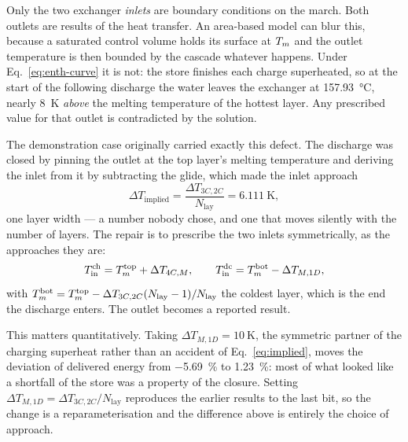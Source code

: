Only the two exchanger \emph{inlets} are boundary conditions on the march. Both
outlets are results of the heat transfer. An area-based model can blur this,
because a saturated control volume holds its surface at $T_{m}$ and the outlet
temperature is then bounded by the cascade whatever happens. Under
Eq.~\eqref{eq:enth-curve} it is not: the store finishes each charge superheated,
so at the start of the following discharge the water leaves the exchanger at
\SI{157.93}{\celsius}, nearly \SI{8}{\kelvin} \emph{above} the melting
temperature of the hottest layer. Any prescribed value for that outlet is
contradicted by the solution.

The demonstration case originally carried exactly this defect. The discharge was
closed by pinning the outlet at the top layer's melting temperature and deriving
the inlet from it by subtracting the glide, which made the inlet approach
\begin{equation}
  \Delta T_{\mathrm{implied}}
  =\frac{\Delta T_{3C,2C}}{N_{\mathrm{lay}}}=\SI{6.111}{\kelvin},
  \label{eq:implied}
\end{equation}
one layer width --- a number nobody chose, and one that moves silently with the
number of layers. The repair is to prescribe the two inlets symmetrically, as
the approaches they are:
\begin{equation}
  T_{\mathrm{in}}^{\mathrm{ch}}=T_{m}^{\mathrm{top}}+\Delta T_{4C,M},
  \qquad
  T_{\mathrm{in}}^{\mathrm{dc}}=T_{m}^{\mathrm{bot}}-\Delta T_{M,1D},
  \label{eq:inlets}
\end{equation}
with $T_{m}^{\mathrm{bot}}=T_{m}^{\mathrm{top}}
-\Delta T_{3C,2C}(N_{\mathrm{lay}}-1)/N_{\mathrm{lay}}$ the coldest layer, which
is the end the discharge enters. The outlet becomes a reported result.

This matters quantitatively. Taking $\Delta T_{M,1D}=\SI{10}{\kelvin}$, the
symmetric partner of the charging superheat rather than an accident of
Eq.~\eqref{eq:implied}, moves the deviation of delivered energy from
\SI{-5.69}{\percent} to \SI{+1.23}{\percent}: most of what looked like a
shortfall of the store was a property of the closure. Setting
$\Delta T_{M,1D}=\Delta T_{3C,2C}/N_{\mathrm{lay}}$ reproduces the earlier
results to the last bit, so the change is a reparameterisation and the
difference above is entirely the choice of approach.

